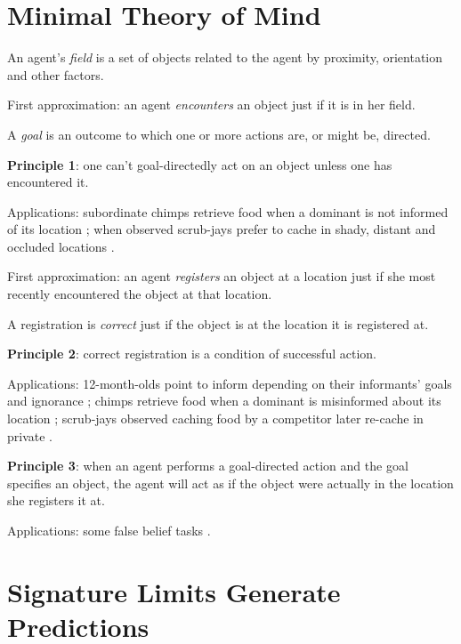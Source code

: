 \documentclass[12pt]{extarticle}
\begin{document}
\begin{multicols}{3}
 
 
\section{Minimal Theory of Mind}
 
An agent’s \emph{field} is a set of objects related to the agent by proximity, orientation and other factors.
 
First approximation: an agent \emph{encounters} an object just if it is in her field.
 
A \emph{goal} is an outcome to which one or more actions are, or might be, directed.
 
 
\textbf{Principle 1}: one can’t goal-directedly act on an object unless one has encountered it.
 
Applications: subordinate chimps retrieve food when a dominant is not informed of its 
location \citep{Hare:2001ph}; when observed scrub-jays prefer to cache in shady, distant and 
occluded locations \citep{Dally:2004xf,Clayton:2007fh}.
 
First approximation: an agent \emph{registers} an object at a location just if she most recently encountered the object at that location.
 
A registration is \emph{correct} just if the object is at the location it is registered at.
 
\textbf{Principle 2}: correct registration is a condition of successful action.
 
Applications: 12-month-olds point to inform depending on their informants’ goals and ignorance \citep{Liszkowski:2008al}; 
chimps retrieve food when a dominant is misinformed about its location \citep{Hare:2001ph}; 
scrub-jays observed caching food by a competitor later re-cache in private \citep{Clayton:2007fh,Emery:2007ze}.
 
\textbf{Principle 3}: when an agent performs a goal-directed action and the goal specifies an object, the agent will act as if the object were actually in the location she registers it at.
 
Applications: some false belief tasks \citep{Onishi:2005hm,Southgate:2007js,Buttelmann:2009gy}.
 
 
 
\section{Signature Limits Generate Predictions}
 

\end{multicols}
\end{document}
